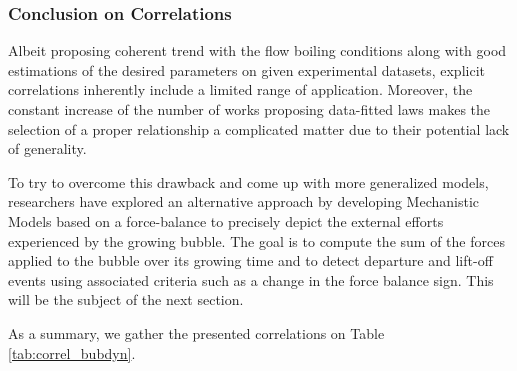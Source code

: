 \subsubsection{Conclusion on Correlations}

Albeit proposing coherent trend with the flow boiling conditions along with good estimations of the desired parameters on given experimental datasets, explicit correlations inherently include a limited range of application. Moreover, the constant increase of the number of works proposing data-fitted laws makes the selection of a proper relationship a complicated matter due to their potential lack of generality.

\npar

To try to overcome this drawback and come up with more generalized models, researchers have explored an alternative approach by developing Mechanistic Models based on a force-balance to precisely depict the external efforts experienced by the growing bubble. The goal is to compute the sum of the forces applied to the bubble over its growing time and to detect departure and lift-off events using associated criteria such as a change in the force balance sign. This will be the subject of the next section.

\npar

As a summary, we gather the presented correlations on Table \ref{tab:correl_bubdyn}.


